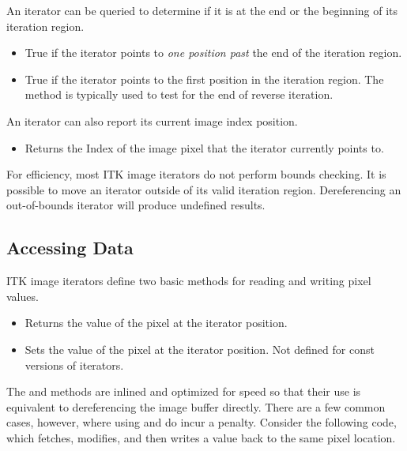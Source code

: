 An iterator can be queried to determine if it is at the end or the beginning of
its iteration region. 

\begin{itemize}
\item \textbf{} True if the iterator points to \emph{one
position past} the end of the iteration region.

\item \textbf{} True if the iterator points to the first
position in the iteration region.  The method is typically used to test for the
end of reverse iteration.

\end{itemize}

An iterator can also report its current image index position.

\begin{itemize}
\item \textbf{} Returns the Index
of the image pixel that the iterator currently points to.
\end{itemize}

For efficiency, most ITK image iterators do not perform bounds checking.  It is
possible to move an iterator outside of its valid iteration region.
Dereferencing an out-of-bounds iterator will produce undefined results.

\subsection{Accessing Data}
\label{sec:AccessingData}
ITK image iterators define two basic methods for reading and writing pixel
values.

\begin{itemize}
\item \textbf{} Returns the value of the pixel at the
iterator position.

\item \textbf{} Sets the value of the pixel at the
iterator position.  Not defined for const versions of iterators.
\end{itemize}

The  and  methods are inlined and optimized
for speed so that their use is equivalent to dereferencing the image
buffer directly.  There are a few common cases, however, where using
 and  do incur a penalty. Consider the
following code, which fetches, modifies, and then writes a value back
to the same pixel location.

